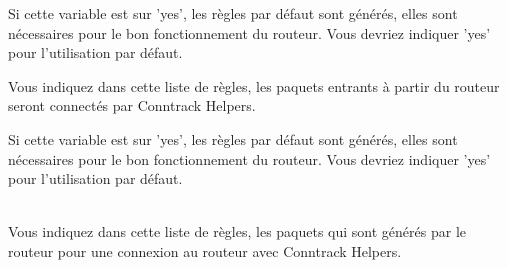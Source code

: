 \begin{description}
Si cette variable est sur 'yes', les règles par défaut sont générés, elles
sont nécessaires pour le bon fonctionnement du routeur. Vous devriez
indiquer 'yes' pour l'utilisation par défaut.

Vous indiquez dans cette liste de règles, les paquets entrants à partir
du routeur seront connectés par Conntrack Helpers.

Si cette variable est sur 'yes', les règles par défaut sont générés, elles
sont nécessaires pour le bon fonctionnement du routeur. Vous devriez
indiquer 'yes' pour l'utilisation par défaut.

\mbox{}\\
Vous indiquez dans cette liste de règles, les paquets qui sont générés par
le routeur pour une connexion au routeur avec Conntrack Helpers.
\end{description}
